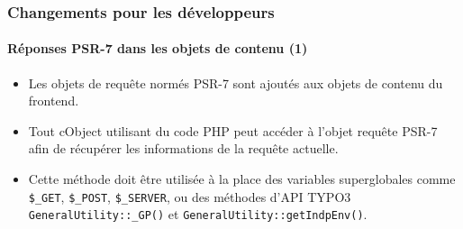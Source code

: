 %

\begin{frame}[fragile]
	\frametitle{Changements pour les développeurs}
	\framesubtitle{Réponses PSR-7 dans les objets de contenu (1)}

	\begin{itemize}
		\item Les objets de requête normés PSR-7 sont ajoutés aux objets de contenu du frontend.
		\item Tout cObject utilisant du code PHP peut accéder à l'objet requête PSR-7
			afin de récupérer les informations de la requête actuelle.
		\item Cette méthode doit être utilisée à la place des variables superglobales
			comme\newline
			\smaller\texttt{\$\_GET}, \texttt{\$\_POST}, \texttt{\$\_SERVER},\normalsize
			ou des méthodes d'API TYPO3\newline
			\smaller\texttt{GeneralUtility::\_GP()}\normalsize
			et
			\smaller\texttt{GeneralUtility::getIndpEnv()}\normalsize.

	\end{itemize}
\end{frame}

